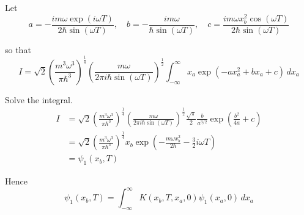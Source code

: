 Let
\begin{equation*}
a=-\frac{im\omega\exp(i\omega T)}{2\hbar\sin(\omega T)},\quad
b=-\frac{im\omega}{\hbar\sin(\omega T)},\quad
c=\frac{im\omega x_b^2\cos(\omega T)}{2\hbar\sin(\omega T)}
\end{equation*}

so that
\begin{equation*}
I=\sqrt2\left(\frac{m^3\omega^3}{\pi\hbar^3}\right)^\frac{1}{4}
\left(\frac{m\omega}{2\pi i\hbar\sin(\omega T)}\right)^\frac{1}{2}
\int_{-\infty}^\infty
x_a\exp(-ax_a^2+bx_a+c)\,dx_a
\end{equation*}

Solve the integral.
\begin{align*}
I&=\sqrt2\left(\frac{m^3\omega^3}{\pi\hbar^3}\right)^\frac{1}{4}
\left(\frac{m\omega}{2\pi i\hbar\sin(\omega T)}\right)^\frac{1}{2}
\frac{\sqrt\pi}{2}\frac{b}{a^{3/2}}\exp\left(\frac{b^2}{4a}+c\right)
\\
&=\sqrt2\left(\frac{m^3\omega^3}{\pi\hbar^3}\right)^\frac{1}{4}
x_b\exp\left(-\frac{m\omega x_b^2}{2\hbar}-\tfrac{3}{2}i\omega T\right)
\\
&=\psi_1(x_b,T)
\end{align*}

Hence
\begin{equation*}
\psi_1(x_b,T)=\int_{-\infty}^\infty K(x_b,T,x_a,0)\psi_1(x_a,0)\,dx_a
\end{equation*}


